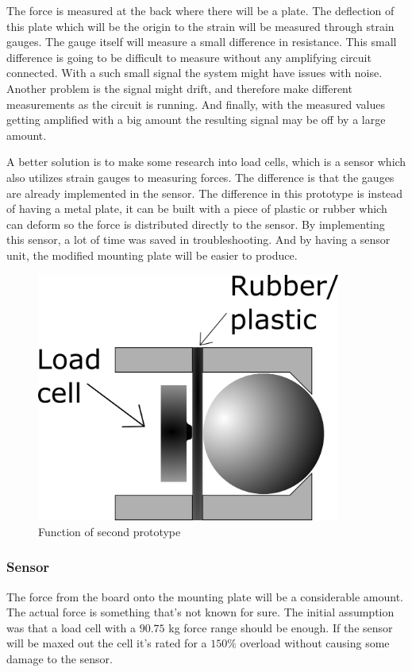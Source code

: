 The force is measured at the back where there will be a plate. The deflection of this plate which will be the origin to the strain will be measured through strain gauges. 
The gauge itself will measure a small difference in resistance. This small difference is going to be difficult to measure without any amplifying circuit connected. With a such small signal the system might have issues with noise. Another problem is the signal might drift, and therefore make different measurements as the circuit is running. And finally, with the measured values getting amplified with a big amount the resulting signal may be off by a large amount. 

A better solution is to make some research into load cells, which is a sensor which also utilizes strain gauges to measuring forces. The difference is that the gauges are already implemented in the sensor. The difference in this prototype is instead of having a metal plate, it can be built with a piece of plastic or rubber which can deform so the force is distributed directly to the sensor. By implementing this sensor, a lot of time was saved in troubleshooting. And by having a sensor unit, the modified mounting plate will be easier to produce. 
 
\begin{figure}[H]
\begin{center}
	\includegraphics[width = 10cm]{Figures/Press_sens_func_2.png}
	\caption{Function of second prototype}
	\label{Press_sens_prot_2}
\end{center}
\end{figure}


\subsubsection{Sensor}
The force from the board onto the mounting plate will be a considerable amount. The actual force is something that’s not known for sure. The initial assumption was that a load cell with a $90.75$ kg force range should be enough. If the sensor will be maxed out the cell it's rated for a $150\%$ overload without causing some damage to the sensor.  

